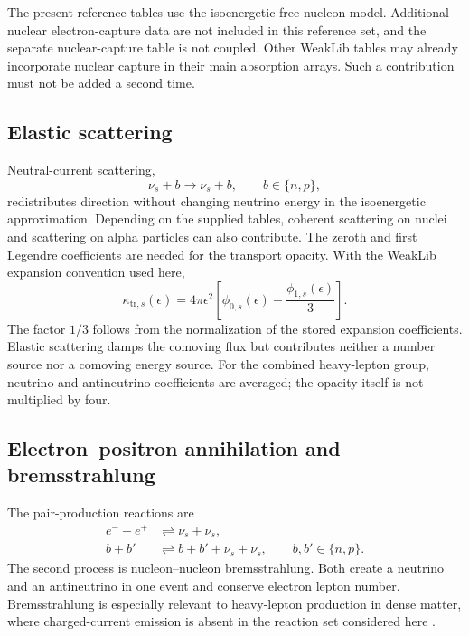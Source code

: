 \documentclass[aps,prd,reprint,nofootinbib,notitlepage]{revtex4-2}
\begin{document}
The present reference tables use the isoenergetic free-nucleon model.
Additional nuclear electron-capture data are not included in this reference
set, and the separate nuclear-capture table is not coupled. Other WeakLib
tables may already incorporate nuclear capture in their main absorption
arrays. Such a contribution must not be added a second time.

\subsection{Elastic scattering}

Neutral-current scattering,
\begin{equation}
 \nu_s+b\longrightarrow\nu_s+b,\qquad b\in\{n,p\},
\end{equation}
redistributes direction without changing neutrino energy in the
isoenergetic approximation. Depending on the supplied tables, coherent
scattering on nuclei and scattering on alpha particles can also contribute.
The zeroth and first Legendre coefficients are needed for the transport
opacity. With the WeakLib expansion convention used here,
\begin{equation}
 \kappa_{\mathrm{tr},s}(\epsilon)
    =4\pi\epsilon^2
       \left[\phi_{0,s}(\epsilon)-\frac{\phi_{1,s}(\epsilon)}{3}\right].
 \label{eq:transport_opacity}
\end{equation}
The factor $1/3$ follows from the normalization of the stored expansion
coefficients. Elastic scattering damps the comoving flux but contributes
neither a number source nor a comoving energy source. For the combined
heavy-lepton group, neutrino and antineutrino coefficients are averaged;
the opacity itself is not multiplied by four.

\subsection{Electron--positron annihilation and bremsstrahlung}

The pair-production reactions are
\begin{align}
 e^-+e^+&\rightleftharpoons\nu_s+\bar\nu_s,\\
 b+b'&\rightleftharpoons b+b'+\nu_s+\bar\nu_s,
 \qquad b,b'\in\{n,p\}.
\end{align}
The second process is nucleon--nucleon bremsstrahlung. Both create a
neutrino and an antineutrino in one event and conserve electron lepton
number. Bremsstrahlung is especially relevant to heavy-lepton production
in dense matter, where charged-current emission is absent in the reaction
set considered here \cite{HannestadRaffelt1998}.
\end{document}
